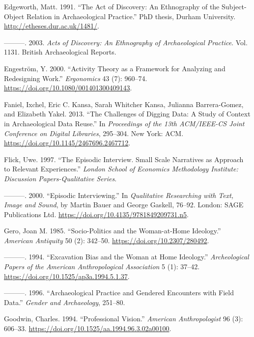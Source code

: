 \documentclass[
]{article}
\newlength{\cslhangindent}
\newenvironment{CSLReferences}[2] %
 {\begin{list}{}{%
  \setlength{\itemindent}{0pt}
  \setlength{\leftmargin}{0pt}
  \setlength{\parsep}{0pt}
  \ifodd #1
   \setlength{\leftmargin}{\cslhangindent}
   \setlength{\itemindent}{-1\cslhangindent}
  \fi
  \setlength{\itemsep}{#2\baselineskip}}}
 {\end{list}}
\begin{document}
\begin{CSLReferences}{1}{0}
Edgeworth, Matt. 1991. {``The Act of Discovery: {An} Ethnography of the
Subject-Object Relation in Archaeological Practice.''} PhD thesis,
Durham University. \url{http://etheses.dur.ac.uk/1481/}.

---------. 2003. \emph{Acts of Discovery: {An} Ethnography of
Archaeological Practice}. Vol. 1131. British Archaeological Reports.

Engeström, Y. 2000. {``Activity Theory as a Framework for Analyzing and
Redesigning Work.''} \emph{Ergonomics} 43 (7): 960--74.
\url{https://doi.org/10.1080/001401300409143}.

Faniel, Ixchel, Eric C. Kansa, Sarah Whitcher Kansa, Julianna
Barrera-Gomez, and Elizabeth Yakel. 2013. {``The {Challenges} of
{Digging Data}: {A Study} of {Context} in {Archaeological Data
Reuse}.''} In \emph{Proceedings of the 13th {ACM}/{IEEE-CS Joint
Conference} on {Digital Libraries}}, 295--304. New York: ACM.
\url{https://doi.org/10.1145/2467696.2467712}.

Flick, Uwe. 1997. {``The Episodic Interview. {Small} Scale Narratives as
Approach to Relevant Experiences.''} \emph{London School of Economics
Methodology Institute: Discussion Papers-Qualitative Series}.

---------. 2000. {``Episodic {Interviewing}.''} In \emph{Qualitative
{Researching} with {Text}, {Image} and {Sound}}, by Martin Bauer and
George Gaskell, 76--92. London: SAGE Publications Ltd.
\url{https://doi.org/10.4135/9781849209731.n5}.

Gero, Joan M. 1985. {``Socio-{Politics} and the {Woman-at-Home
Ideology}.''} \emph{American Antiquity} 50 (2): 342--50.
\url{https://doi.org/10.2307/280492}.

---------. 1994. {``Excavation {Bias} and the {Woman} at {Home
Ideology}.''} \emph{Archeological Papers of the American Anthropological
Association} 5 (1): 37--42.
\url{https://doi.org/10.1525/ap3a.1994.5.1.37}.

---------. 1996. {``Archaeological Practice and Gendered Encounters with
Field Data.''} \emph{Gender and Archaeology}, 251--80.

Goodwin, Charles. 1994. {``Professional {Vision}.''} \emph{American
Anthropologist} 96 (3): 606--33.
\url{https://doi.org/10.1525/aa.1994.96.3.02a00100}.


\end{CSLReferences}
\end{document}

